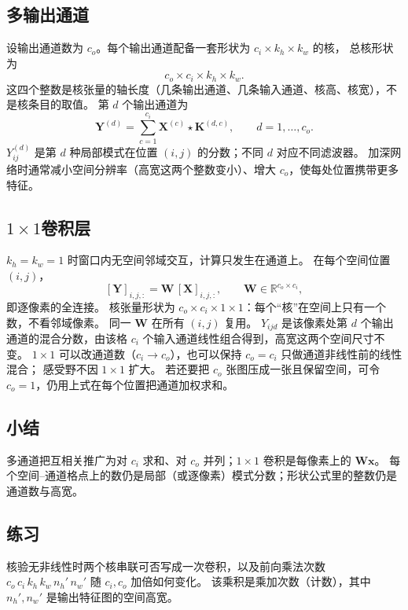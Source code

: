 \subsection{多输出通道}

设输出通道数为 $c_o$。每个输出通道配备一套形状为 $c_i\times k_h\times k_w$ 的核，
总核形状为
\[
c_o\times c_i\times k_h\times k_w.
\]
这四个整数是核张量的轴长度（几条输出通道、几条输入通道、核高、核宽），不是核条目的取值。
第 $d$ 个输出通道为
\[
\bm{Y}^{(d)}
=
\sum_{c=1}^{c_i}
\bm{X}^{(c)}\star\bm{K}^{(d,c)},
\qquad
d=1,\ldots,c_o.
\]
$Y^{(d)}_{ij}$ 是第 $d$ 种局部模式在位置 $(i,j)$ 的分数；不同 $d$ 对应不同滤波器。
加深网络时通常减小空间分辨率（高宽这两个整数变小）、增大 $c_o$，使每处位置携带更多特征。

\subsection{\texorpdfstring{$1\times 1$卷积层}{1x1卷积层}}

$k_h=k_w=1$ 时窗口内无空间邻域交互，计算只发生在通道上。
在每个空间位置 $(i,j)$，
\[
[\bm{Y}]_{i,j,:}
=
\bm{W}\,[\bm{X}]_{i,j,:},
\qquad
\bm{W}\in\mathbb{R}^{c_o\times c_i},
\]
即逐像素的全连接。
核张量形状为 $c_o\times c_i\times 1\times 1$：每个“核”在空间上只有一个数，不看邻域像素。
同一 $\bm{W}$ 在所有 $(i,j)$ 复用。
$Y_{ijd}$ 是该像素处第 $d$ 个输出通道的混合分数，由该格 $c_i$ 个输入通道线性组合得到，高宽这两个空间尺寸不变。
$1\times 1$ 可以改通道数（$c_i\to c_o$），也可以保持 $c_o=c_i$ 只做通道非线性前的线性混合；
感受野不因 $1\times 1$ 扩大。
若还要把 $c_o$ 张图压成一张且保留空间，可令 $c_o=1$，仍用上式在每个位置把通道加权求和。

\subsection{小结}

多通道把互相关推广为对 $c_i$ 求和、对 $c_o$ 并列；$1\times 1$ 卷积是每像素上的 $\bm{W}\bm{x}$。
每个空间--通道格点上的数仍是局部（或逐像素）模式分数；形状公式里的整数仍是通道数与高宽。

\subsection{练习}

核验无非线性时两个核串联可否写成一次卷积，以及前向乘法次数
$c_o\,c_i\,k_h\,k_w\,n_h'\,n_w'$ 随 $c_i,c_o$ 加倍如何变化。
该乘积是乘加次数（计数），其中 $n_h',n_w'$ 是输出特征图的空间高宽。

